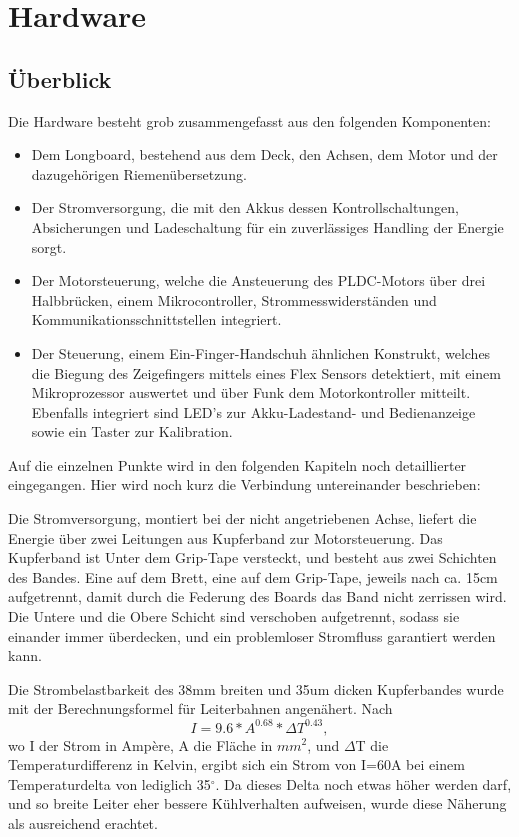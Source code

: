 \chapter{Hardware}
\label{Hardware}
\section{Überblick}

Die Hardware besteht grob zusammengefasst aus den folgenden Komponenten:
\begin{itemize}
	\item Dem Longboard, bestehend aus dem Deck, den Achsen, dem Motor und der dazugehörigen Riemenübersetzung.
	\item Der Stromversorgung, die mit den Akkus dessen Kontrollschaltungen, Absicherungen und Ladeschaltung für ein zuverlässiges Handling der Energie sorgt.
	\item Der Motorsteuerung, welche die Ansteuerung des PLDC-Motors über drei Halbbrücken, einem Mikrocontroller, Strommesswiderständen und Kommunikationsschnittstellen integriert.
	\item Der Steuerung, einem Ein-Finger-Handschuh ähnlichen Konstrukt, welches die Biegung des Zeigefingers mittels eines Flex Sensors detektiert, mit einem Mikroprozessor auswertet und über Funk dem Motorkontroller mitteilt. Ebenfalls integriert sind LED’s zur Akku-Ladestand- und Bedienanzeige sowie ein Taster zur Kalibration.
\end{itemize}
Auf die einzelnen Punkte wird in den folgenden Kapiteln noch detaillierter eingegangen. Hier wird noch kurz die Verbindung untereinander beschrieben:

Die Stromversorgung, montiert bei der nicht angetriebenen Achse, liefert die Energie über zwei Leitungen aus Kupferband zur Motorsteuerung. Das Kupferband ist Unter dem Grip-Tape versteckt, und besteht aus zwei Schichten des Bandes. Eine auf dem Brett, eine auf dem Grip-Tape, jeweils nach ca. 15cm aufgetrennt, damit durch die Federung des Boards das Band nicht zerrissen wird. Die Untere und die Obere Schicht sind verschoben aufgetrennt, sodass sie einander immer überdecken, und ein problemloser Stromfluss garantiert werden kann.

Die Strombelastbarkeit des 38mm breiten und 35um dicken Kupferbandes wurde mit der Berechnungsformel für Leiterbahnen angenähert.
Nach
\[ I = 9.6 * A^{0.68} * \Delta T ^{0.43},\] 
wo I der Strom in Ampère, A die Fläche in \(mm^2\), und \(\Delta\)T die Temperaturdifferenz in Kelvin,
ergibt sich ein Strom von I=60A bei einem Temperaturdelta von lediglich 35\(^\circ\). Da dieses Delta noch etwas höher werden darf, und so breite Leiter eher bessere Kühlverhalten aufweisen, wurde diese Näherung als ausreichend erachtet.

